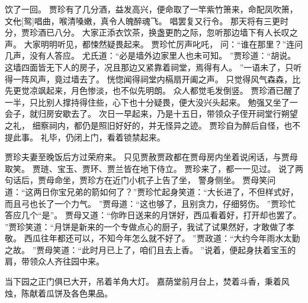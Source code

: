 饮了一回。
贾珍有了几分酒，益发高兴，便命取了一竿紫竹箫来，命配凤吹箫，文\sout{化}[鸳]唱曲，喉清嗓嫩，真令人魄醉魂飞。
唱罢复又行令。
那天将有三更时分，贾珍酒已八分。
大家正添衣饮茶，换盏更酌之际，忽听那边墙下有人长叹之声。
大家明明听见，都悚然疑畏起来。
贾珍忙厉声叱吒，
问：“谁在那里？”连问几声，没有人答应。
尤氏道：“必是墙外边家里人也未可知。
”贾珍道：“胡说。
这墙四面皆无下人的房子，况且那边又紧靠着祠堂，焉得有人。
”一语未了，只听得一阵风声，竟过墙去了。
恍惚闻得祠堂内槅扇开阖之声。
只觉得风气森森，比先更觉凉飒起来，月色惨淡，也不似先明朗。
众人都觉毛发倒竖。
贾珍酒已醒了一半，只比别人撑持得住些，心下也十分疑畏，便大没兴头起来。
勉强又坐了一会子，就归房安歇去了。
次日一早起来，乃是十五日，带领众子侄开祠堂行朔望之礼，
细察祠内，都仍是照旧好好的，并无怪异之迹。
贾珍自为醉后自怪，也不提此事。
礼毕，仍闭上门，看着锁禁起来。
\par
贾珍夫妻至晚饭后方过荣府来。
只见贾赦贾政都在贾母房内坐着说闲话，与贾母取笑。
贾琏、宝玉、贾环、贾兰皆在地下侍立。
贾珍来了，都一一见过。
说了两句话后，贾母命坐，贾珍方在近门小杌子上告了坐，
警身侧坐。
贾母笑问道：“这两日你宝兄弟的箭如何了？”贾珍忙起身笑道：“大长进了，不但样式好，而且弓也长了一个力气。
”贾母道：“这也够了，且别贪力，仔细努伤。
”贾珍忙答应几个“是”。
贾母又道：“你昨日送来的月饼好，西瓜看着好，打开却也罢了。
”贾珍笑道：“月饼是新来的一个专做点心的厨子，我试了试果然好，才敢做了孝敬。
西瓜往年都还可以，不知今年怎么就不好了。
”贾政道：“大约今年雨水太勤之故。
”贾母笑道：“此时月已上了，咱们且去上香。
”说着，便起身扶着宝玉的肩，带领众人齐往园中来。
\par
当下园之正门俱已大开，吊着羊角大灯。
嘉荫堂前月台上，焚着斗香，秉着风烛，陈献着瓜饼及各色果品。
